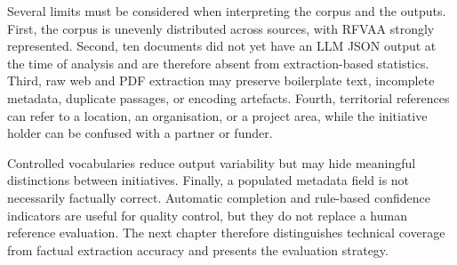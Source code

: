 Several limits must be considered when interpreting the corpus and the outputs.
First, the corpus is unevenly distributed across sources, with RFVAA strongly
represented. Second, ten documents did not yet have an LLM JSON output at the
time of analysis and are therefore absent from extraction-based statistics.
Third, raw web and PDF extraction may preserve boilerplate text, incomplete
metadata, duplicate passages, or encoding artefacts. Fourth,
territorial references can refer to a location, an organisation, or a project
area, while the initiative holder can be confused with a partner or funder.

Controlled vocabularies reduce output variability but may hide
meaningful distinctions between initiatives. Finally, a populated metadata field
is not necessarily factually correct. Automatic completion and rule-based
confidence indicators are useful for quality control, but they do not replace a
human reference evaluation. The next chapter therefore distinguishes technical
coverage from factual extraction accuracy and presents the evaluation strategy.
